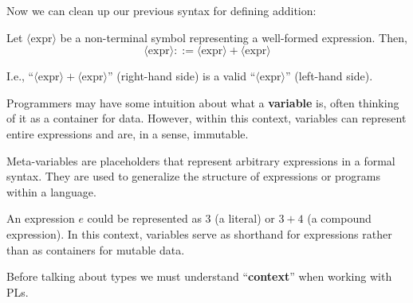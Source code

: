 \noindent
Now we can clean up our previous syntax for defining addition:

\begin{Example}

    \label{ex:production_rule_addition}
    Let $\langle \text{expr} \rangle$ be a non-terminal symbol representing a well-formed expression. Then,
    \vspace{-.5em}
    \[\langle \text{expr} \rangle ::= \langle \text{expr} \rangle + \langle \text{expr} \rangle\]

    \vspace{-.5em}
    \noindent
    I.e., ``$\langle \text{expr} \rangle + \langle \text{expr} \rangle$'' (right-hand side) 
    is a valid ``$\langle \text{expr} \rangle$'' (left-hand side).
\end{Example}


\newpage

\noindent
Programmers may have some intuition about what a \textbf{variable} is, often thinking of it as a container for data.
However, within this context, variables can represent entire expressions and are, in a sense, immutable.
\begin{Def}

    Meta-variables are placeholders that represent arbitrary expressions in a formal syntax.
    They are used to generalize the structure of expressions or programs within a language.
\end{Def}

\vspace{-1em}
\begin{Example}

    An expression $e$ could be represented as $3$ (a literal) or $3 + 4$ (a compound expression).
    In this context, variables serve as shorthand for expressions rather than as containers for mutable data.
\end{Example}

\noindent
Before talking about types we must understand ``\textbf{context}'' when working with PLs.


